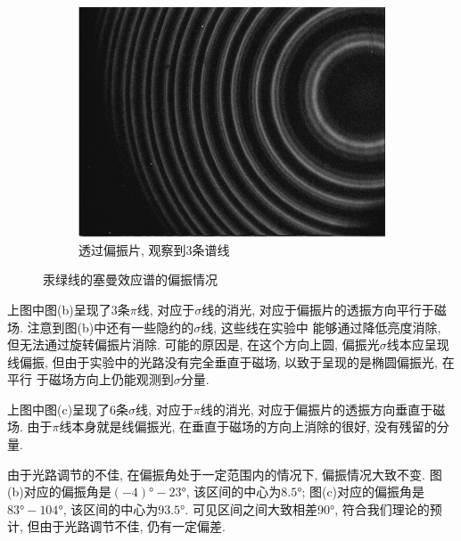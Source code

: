 \documentclass[12pt,a4paper]{article}
\begin{document}
\begin{figure}[H]
\begin{subfigure}[b]{0.3\textwidth}
      \includegraphics[width=\textwidth]{2.74gp6.jpg}
      \caption{透过偏振片, 观察到3条谱线}
    \end{subfigure}
    \caption{汞绿线的塞曼效应谱的偏振情况}
  \end{figure}

上图中图(b)呈现了3条$\pi$线, 对应于$\sigma$线的消光, 对应于偏振片的透振方向平行于磁场. 注意到图(b)中还有一些隐约的$\sigma$线, 这些线在实验中
能够通过降低亮度消除, 但无法通过旋转偏振片消除. 可能的原因是, 在这个方向上圆, 偏振光$\sigma$线本应呈现线偏振, 但由于实验中的光路没有完全垂直于磁场, 以致于呈现的是椭圆偏振光, 在平行
于磁场方向上仍能观测到$\sigma$分量. 

上图中图(c)呈现了6条$\sigma$线, 对应于$\pi$线的消光, 对应于偏振片的透振方向垂直于磁场. 由于$\pi$线本身就是线偏振光, 在垂直于磁场的方向上消除的很好, 没有残留的分量. 

由于光路调节的不佳, 在偏振角处于一定范围内的情况下, 偏振情况大致不变. 图(b)对应的偏振角是$(-4)°-23°$, 该区间的中心为$8.5°$; 图(c)对应的偏振角是$83°-104°$, 该区间的中心为$93.5°$. 可见区间之间大致相差90°, 
符合我们理论的预计, 但由于光路调节不佳, 仍有一定偏差. 
\end{document}
